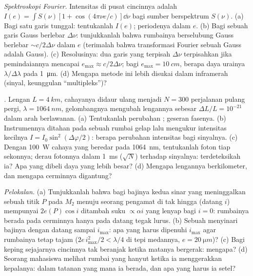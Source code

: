 \begin{exercise}[$\star\star\star$]\label{exo:b2:michelson:10}
\emph{Spektroskopi Fourier.} Intensitas di pusat cincinnya
adalah $I(e) = \int S(\nu)[1 + \cos(4\pi\nu e/c)]\dd\nu$ bagi sumber berspektrum
$S(\nu)$. (a) Bagi satu garis tunggal: tentukanlah $I(e)$; periodenya dalam $e$. (b) Bagi sebuah garis
Gauss berlebar $\Delta\nu$: tunjukkanlah bahwa rumbainya berselubung Gauss berlebar
$\sim c/2\Delta\nu$ dalam $e$ (terimalah bahwa transformasi Fourier sebuah Gauss
adalah Gauss). (c) Resolusinya: dua garis yang terpisah $\Delta\nu$ terpisahkan jika
pemindaiannya mencapai $e_{\max} \approx c/2\Delta\nu$; bagi $e_{\max} = \qty{10}{cm}$, berapa
daya urainya $\lambda/\Delta\lambda$ pada \qty{1}{\micro m}. (d) Mengapa metode ini
lebih disukai dalam inframerah (sinyal, keunggulan ``multipleks'')?
\end{exercise}

\begin{exercise}[$\star\star\star$]\label{exo:b2:michelson:11}
\emph{.} Lengan $L = \qty{4}{km}$, cahayanya didaur ulang
menjadi $N = 300$ perjalanan pulang pergi, $\lambda = \qty{1064}{nm}$, gelombangnya mengubah lengannya sebesar
$\Delta L/L = 10^{-21}$ dalam arah berlawanan. (a) Tentukanlah perubahan ;
geseran fasenya. (b) Instrumennya ditahan pada sebuah rumbai gelap lalu mengukur
intensitas kecilnya $I = I_0\sin^2(\Delta\varphi/2)$: berapa perubahan intensitas bagi
sinyalnya. (c) Dengan \qty{100}{W} cahaya yang beredar pada \qty{1064}{nm}, tentukanlah foton
tiap sekonnya; derau fotonnya dalam \qty{1}{ms} ($\sqrt N$) terhadap sinyalnya:
terdeteksikah ia? Apa yang dibeli daya yang lebih besar? (d) Mengapa lengannya
berkilometer, dan mengapa cerminnya digantung?
\end{exercise}

\begin{exercise}[$\star\star\star$]\label{exo:b2:michelson:12}
\emph{Pelokalan.} (a) Tunjukkanlah bahwa bagi bajinya kedua sinar yang meninggalkan sebuah
titik $P$ pada $M_2$ menuju seorang pengamat di tak hingga (datang $i$) mempunyai
 $2e(P)\cos i$ ditambah suku $\propto\alpha i$ yang lenyap bagi
$i = 0$: rumbainya berada pada cerminnya hanya pada datang tegak lurus. (b)
Sebuah  menyinari bajinya dengan datang sampai
$i_{\max}$: apa yang harus dipenuhi $i_{\max}$ agar rumbainya tetap tajam
($2e\,i_{\max}^2/2 < \lambda/4$ di tepi medannya, $e = \qty{20}{\micro m}$)? (c)
Bagi keping sejajarnya cincinnya tak beranjak ketika matanya bergerak:
mengapa? (d) Seorang mahasiswa melihat rumbai yang hanyut ketika ia menggerakkan kepalanya:
dalam tatanan yang mana ia berada, dan apa yang harus ia setel?
\end{exercise}

